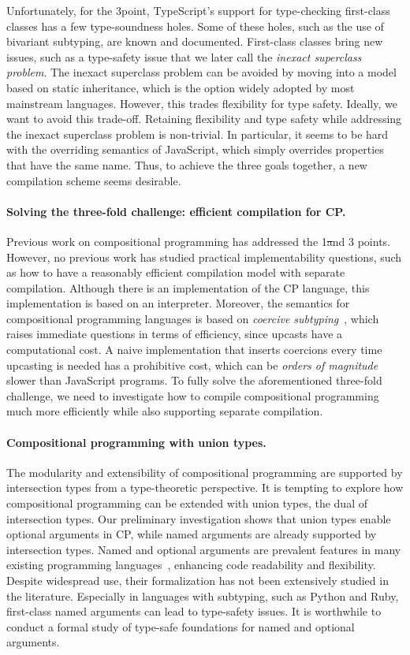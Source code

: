 Unfortunately, for the 3\rd point, TypeScript's support for type-checking
first-class classes has a few type-soundness holes. Some of these holes, such as
the use of bivariant subtyping, are known and documented. First-class classes
bring new issues, such as a type-safety issue that we later call the
\emph{inexact superclass problem}. The inexact superclass problem can be avoided
by moving into a model based on static inheritance, which is the option widely
adopted by most mainstream languages. However, this trades flexibility for type
safety. Ideally, we want to avoid this trade-off. Retaining flexibility and type
safety while addressing the inexact superclass problem is non-trivial. In
particular, it seems to be hard with the overriding semantics of JavaScript,
which simply overrides properties that have the same name. Thus, to achieve the
three goals together, a new compilation scheme seems desirable.

\paragraph{Solving the three-fold challenge: efficient compilation for CP.}
Previous work on compositional programming has addressed the 1\st and 3\rd
points. However, no previous work has studied practical implementability
questions, such as how to have a reasonably efficient compilation model with
separate compilation. Although there is an implementation of the CP language,
this implementation is based on an interpreter. Moreover, the semantics for
compositional programming languages is based on \emph{coercive
subtyping}~\citep{luo2013coercive}, which raises immediate questions in terms of
efficiency, since upcasts have a computational cost. A naive implementation that
inserts coercions every time upcasting is needed has a prohibitive cost, which
can be \emph{orders of magnitude} slower than JavaScript programs. To fully
solve the aforementioned three-fold challenge, we need to investigate how to
compile compositional programming much more efficiently while also supporting
separate compilation.

\paragraph{Compositional programming with union types.}
The modularity and extensibility of compositional programming are supported by
intersection types from a type-theoretic perspective. It is tempting to explore
how compositional programming can be extended with union types, the dual of
intersection types. Our preliminary investigation shows that union types enable
optional arguments in CP, while named arguments are already supported by
intersection types. Named and optional arguments are prevalent features in many
existing programming
languages~\citep{garrigue2001labeled,flatt2009keyword,rytz2010named}, enhancing
code readability and flexibility. Despite widespread use, their formalization
has not been extensively studied in the literature. Especially in languages with
subtyping, such as Python and Ruby, first-class named arguments can lead to
type-safety issues. It is worthwhile to conduct a formal study of type-safe
foundations for named and optional arguments.

